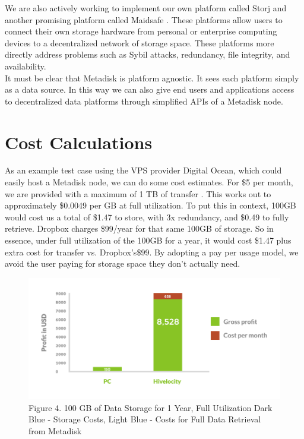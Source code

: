 \documentclass[a4paper,10pt]{article}
\begin{document}
We are also actively working to implement our own platform called Storj \cite{7} and another promising platform called Maidsafe \cite{1}. These platforms allow users to connect their own storage hardware from personal or enterprise computing devices to a decentralized network of storage space. These platforms more directly address problems such as Sybil attacks, redundancy, file integrity, and availability.  \\

It must be clear that Metadisk is platform agnostic. It sees each platform simply as a data source. In this way we can also give end users and applications access to decentralized data platforms through simplified APIs of a Metadisk node. 

\section*{Cost Calculations}

As an example test case using the VPS provider Digital Ocean, which could easily host a Metadisk node, we can do some cost estimates. For \$5 per month, we are provided with a maximum of 1 TB of transfer \cite{8}. This works out to approximately \$0.0049 per GB at full utilization. To put this in context, 100GB would cost us a total of \$1.47 to store, with 3x redundancy, and \$0.49 to fully retrieve.  Dropbox charges \$99/year for that same 100GB of storage. So in essence, under full utilization of the 100GB for a year, it would cost \$1.47 plus extra cost for transfer vs. Dropbox’s\$99.  By adopting a pay per usage model, we avoid the user  paying for storage space they don’t actually need.\\

\begin{figure}[h!]
  \centering
      \includegraphics[width=\linewidth]{05}
  \caption{Figure 4. 100 GB of Data Storage for 1 Year, Full Utilization
Dark Blue - Storage Costs, Light Blue - Costs for Full Data Retrieval from Metadisk}
\end{figure}
\end{document}
